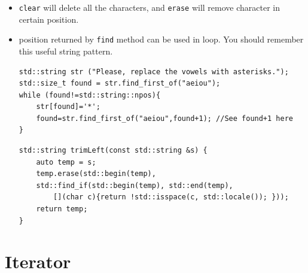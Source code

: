 \documentclass[a4paper,11pt,twoside]{book}
\begin{document}
\begin{itemize}
	\item \texttt{clear} will delete all the characters, and \texttt{erase} will remove character in certain position.
	
	\item position returned by \texttt{find} method can be used in loop. You should remember this useful string pattern.
\begin{lstlisting}[numbers=none]
std::string str ("Please, replace the vowels with asterisks.");
std::size_t found = str.find_first_of("aeiou");
while (found!=std::string::npos){
	str[found]='*';
	found=str.find_first_of("aeiou",found+1); //See found+1 here
}
\end{lstlisting}

\begin{lstlisting}[numbers=none]
std::string trimLeft(const std::string &s) {
	auto temp = s;
	temp.erase(std::begin(temp), 
	std::find_if(std::begin(temp), std::end(temp), 
		[](char c){return !std::isspace(c, std::locale()); }));
	return temp;
}
\end{lstlisting}
	
\end{itemize}

\section{Iterator}
\end{document}
